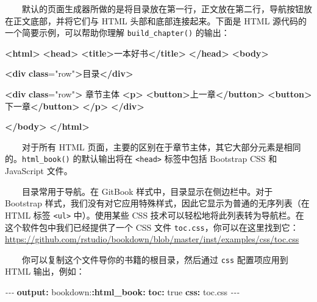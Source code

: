 \documentclass[
  12pt,
]{krantz}
\newenvironment{Shaded}{\begin{snugshade}}{\end{snugshade}}
\newcommand{\AttributeTok}[1]{\textcolor[rgb]{0.13,0.29,0.53}{#1}}
\newcommand{\CharTok}[1]{\textcolor[rgb]{0.31,0.60,0.02}{#1}}
\newcommand{\ErrorTok}[1]{\textcolor[rgb]{0.64,0.00,0.00}{\textbf{#1}}}
\newcommand{\FunctionTok}[1]{\textcolor[rgb]{0.13,0.29,0.53}{\textbf{#1}}}
\newcommand{\KeywordTok}[1]{\textcolor[rgb]{0.13,0.29,0.53}{\textbf{#1}}}
\newcommand{\NormalTok}[1]{#1}
\newcommand{\OtherTok}[1]{\textcolor[rgb]{0.56,0.35,0.01}{#1}}
\newcommand{\PreprocessorTok}[1]{\textcolor[rgb]{0.56,0.35,0.01}{\textit{#1}}}
\newcommand{\StringTok}[1]{\textcolor[rgb]{0.31,0.60,0.02}{#1}}
\theoremstyle{definition}
\theoremstyle{definition}
\theoremstyle{definition}
\theoremstyle{definition}
\theoremstyle{remark}
\begin{document}
  默认的页面生成器所做的是将目录放在第一行，正文放在第二行，导航按钮放在正文底部，并将它们与 HTML 头部和底部连接起来。下面是 HTML 源代码的一个简要示例，可以帮助你理解 \texttt{build\_chapter()} 的输出：

\begin{Shaded}
\begin{Highlighting}[]
\KeywordTok{\textless{}html\textgreater{}}
  \KeywordTok{\textless{}head\textgreater{}}
    \KeywordTok{\textless{}title\textgreater{}}\NormalTok{一本好书}\KeywordTok{\textless{}/title\textgreater{}}
  \KeywordTok{\textless{}/head\textgreater{}}
  \KeywordTok{\textless{}body\textgreater{}}
  
    \KeywordTok{\textless{}div} \ErrorTok{class}\OtherTok{=}\StringTok{"row"}\KeywordTok{\textgreater{}}\NormalTok{目录}\KeywordTok{\textless{}/div\textgreater{}}
    
    \KeywordTok{\textless{}div} \ErrorTok{class}\OtherTok{=}\StringTok{"row"}\KeywordTok{\textgreater{}}
\NormalTok{      章节主体}
      \KeywordTok{\textless{}p\textgreater{}}
        \KeywordTok{\textless{}button\textgreater{}}\NormalTok{上一章}\KeywordTok{\textless{}/button\textgreater{}}
        \KeywordTok{\textless{}button\textgreater{}}\NormalTok{下一章}\KeywordTok{\textless{}/button\textgreater{}}
      \KeywordTok{\textless{}/p\textgreater{}}
    \KeywordTok{\textless{}/div\textgreater{}}
  
  \KeywordTok{\textless{}/body\textgreater{}}
\KeywordTok{\textless{}/html\textgreater{}}
\end{Highlighting}
\end{Shaded}

  对于所有 HTML 页面，主要的区别在于章节主体，其它大部分元素是相同的。\texttt{html\_book()} 的默认输出将在 \texttt{\textless{}head\textgreater{}} 标签中包括 Bootstrap CSS 和 JavaScript 文件。

  目录常用于导航。在 GitBook 样式中，目录显示在侧边栏中。对于 Bootstrap 样式，我们没有对它应用特殊样式，因此它显示为普通的无序列表（在 HTML 标签 \texttt{\textless{}ul\textgreater{}} 中）。使用某些 CSS 技术可以轻松地将此列表转为导航栏。在这个软件包中我们已经提供了一个 CSS 文件 \texttt{toc.css}，你可以在这里找到它：\url{https://github.com/rstudio/bookdown/blob/master/inst/examples/css/toc.css}

  你可以复制这个文件导你的书籍的根目录，然后通过 \texttt{css} 配置项应用到 HTML 输出，例如：

\begin{Shaded}
\begin{Highlighting}[]
\PreprocessorTok{{-}{-}{-}}
\FunctionTok{output}\KeywordTok{:}
\AttributeTok{  bookdown:}\FunctionTok{:html\_book}\KeywordTok{:}
\AttributeTok{    }\FunctionTok{toc}\KeywordTok{:}\AttributeTok{ }\CharTok{true}
\AttributeTok{    }\FunctionTok{css}\KeywordTok{:}\AttributeTok{ toc.css}
\PreprocessorTok{{-}{-}{-}}
\end{Highlighting}
\end{Shaded}
\end{document}
